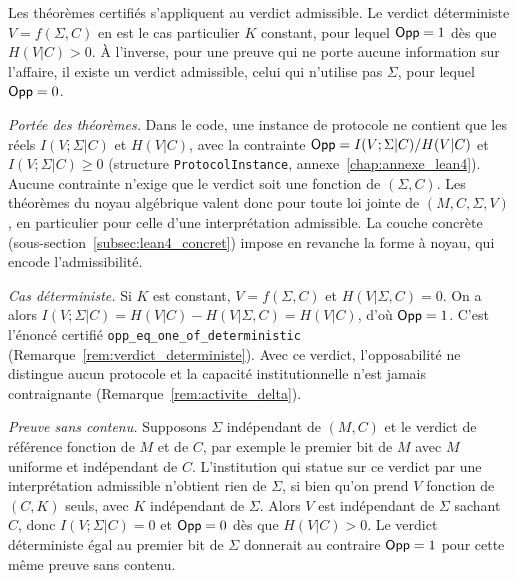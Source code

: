 \begin{sloppypar}
\begin{remark}
\label{rem:opp_lean4_admissible}
Les th\'eor\`emes certifi\'es s'appliquent au verdict admissible. Le verdict
d\'eterministe $V = f(\Sigma, C)$ en est le cas particulier $K$ constant, pour lequel
$\mathsf{Opp} = 1$ d\`es que $H(V|C) > 0$. \`A l'inverse, pour une preuve qui ne porte aucune
information sur l'affaire, il existe un verdict admissible, celui qui n'utilise pas
$\Sigma$, pour lequel $\mathsf{Opp} = 0$.
\end{remark}

\begin{Preuve}
\emph{Port\'ee des th\'eor\`emes.} Dans le code, une instance de protocole ne contient
que les r\'eels $I(V;\Sigma|C)$ et $H(V|C)$, avec la contrainte
$\mathsf{Opp} = I(V;\Sigma|C)/H(V|C)$ et $I(V;\Sigma|C) \geq 0$
(structure \texttt{ProtocolInstance}, annexe~\ref{chap:annexe_lean4}). Aucune
contrainte n'exige que le verdict soit une fonction de $(\Sigma, C)$. Les
th\'eor\`emes du noyau alg\'ebrique valent donc pour toute loi jointe de $(M, C, \Sigma, V)$,
en particulier pour celle d'une interpr\'etation admissible. La couche concr\`ete
(sous-section~\ref{subsec:lean4_concret}) impose en revanche la forme \`a noyau, qui
encode l'admissibilit\'e.

\emph{Cas d\'eterministe.} Si $K$ est constant, $V = f(\Sigma, C)$ et $H(V|\Sigma,C) = 0$.
On a alors $I(V;\Sigma|C) = H(V|C) - H(V|\Sigma,C) = H(V|C)$, d'o\`u $\mathsf{Opp} = 1$. C'est
l'\'enonc\'e certifi\'e \texttt{opp\_eq\_one\_of\_deterministic}
(Remarque~\ref{rem:verdict_deterministe}). Avec ce verdict, l'opposabilit\'e ne
distingue aucun protocole et la capacit\'e institutionnelle n'est jamais
contraignante (Remarque~\ref{rem:activite_delta}).

\emph{Preuve sans contenu.} Supposons $\Sigma$ ind\'ependant de $(M, C)$ et le verdict
de r\'ef\'erence fonction de $M$ et de $C$, par exemple le premier bit de $M$ avec $M$
uniforme et ind\'ependant de $C$. L'institution qui statue sur ce verdict par une
interpr\'etation admissible n'obtient rien de $\Sigma$, si bien qu'on prend $V$ fonction
de $(C, K)$ seuls, avec $K$ ind\'ependant de $\Sigma$. Alors $V$ est ind\'ependant de
$\Sigma$ sachant $C$, donc $I(V;\Sigma|C) = 0$ et $\mathsf{Opp} = 0$ d\`es que $H(V|C) > 0$. Le
verdict d\'eterministe \'egal au premier bit de $\Sigma$ donnerait au contraire $\mathsf{Opp} = 1$
pour cette m\^eme preuve sans contenu.
\end{Preuve}


\end{sloppypar}

